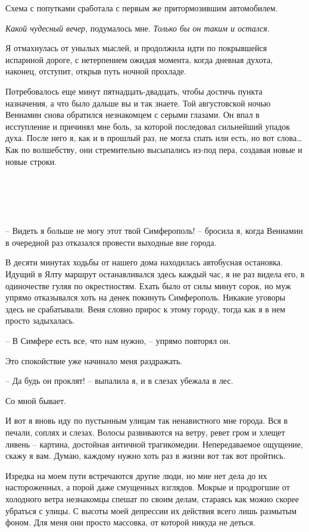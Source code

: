 \documentclass[
]{book}
\begin{document}
Схема с попутками сработала с первым же притормозившим автомобилем.

\emph{Какой чудесный вечер}, подумалось мне. \emph{Только бы он таким и остался.}

Я отмахнулась от унылых мыслей, и продолжила идти по покрывшейся испариной дороге, с нетерпением ожидая момента, когда дневная духота, наконец, отступит, открыв путь ночной прохладе.

Потребовалось еще минут пятнадцать-двадцать, чтобы достичь пункта назначения, а что было дальше вы и так знаете. Той августовской ночью Вениамин снова обратился незнакомцем с серыми глазами. Он впал в исступление и причинял мне боль, за которой последовал сильнейший упадок духа. После него я, как и в прошлый раз, не могла спать или есть, но вот слова\ldots{} Как по волшебству, они стремительно высыпались из-под пера, создавая новые и новые строки.

\hypertarget{chapter-68}{%
\chapter{~}\label{chapter-68}}

-- Видеть я больше не могу этот твой Симферополь! -- бросила я, когда Вениамин в очередной раз отказался провести выходные вне города.

В десяти минутах ходьбы от нашего дома находилась автобусная остановка. Идущий в Ялту маршрут останавливался здесь каждый час, я не раз видела его, в одиночестве гуляя по окрестностям. Ехать было от силы минут сорок, но муж упрямо отказывался хоть на денек покинуть Симферополь. Никакие уговоры здесь не срабатывали. Веня словно прирос к этому городу, тогда как я в нем просто задыхалась.

-- В Симфере есть все, что нам нужно, -- упрямо повторял он.

Это спокойствие уже начинало меня раздражать.

-- Да будь он проклят! -- выпалила я, и в слезах убежала в лес.

Со мной бывает.

И вот я вновь иду по пустынным улицам так ненавистного мне города. Вся в печали, соплях и слезах. Волосы развиваются на ветру, ревет гром и хлещет ливень -- картина, достойная античной трагикомедии. Непередаваемое ощущение, скажу я вам. Думаю, каждому нужно хоть раз в жизни вот так вот пройтись.

Изредка на моем пути встречаются другие люди, но мне нет дела до их настороженных, а порой даже смущенных взглядов. Мокрые и продрогшие от холодного ветра незнакомцы спешат по своим делам, стараясь как можно скорее убраться с улицы. С высоты моей депрессии их действия всего лишь размытым фоном. Для меня они просто массовка, от которой никуда не деться.
\end{document}
